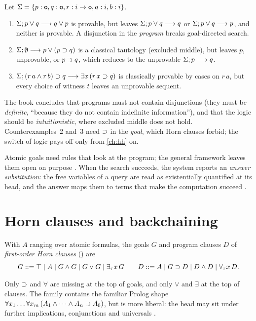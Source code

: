\begin{example}\label{ex:horn-counter}
Let $\Sigma=\{p:\mathsf{o},q:\mathsf{o},r:i\to\mathsf{o},a:i,b:i\}$.
\begin{enumerate}
  \item $\Sigma;p\vee q\longrightarrow q\vee p$ is provable, but  leaves $\Sigma;p\vee q\longrightarrow q$ or
    $\Sigma;p\vee q\longrightarrow p$, and neither is provable. A disjunction in the \emph{program} breaks
    goal-directed search.
  \item $\Sigma;\emptyset\longrightarrow p\vee(p\supset q)$ is a classical tautology (excluded middle), but 
    leaves $p$, unprovable, or $p\supset q$, which  reduces to the unprovable $\Sigma;p\longrightarrow q$.
  \item $\Sigma;(r\,a\wedge r\,b)\supset q\longrightarrow\exists x\,(r\,x\supset q)$ is classically provable by cases on
    $r\,a$, but every choice of witness $t$ leaves an unprovable sequent.
\end{enumerate}
\end{example}
The book concludes  that programs must not contain disjunctions (they must be \emph{definite},
``because they do not contain indefinite information''), and that the logic should be
\emph{intuitionistic}, where excluded middle does not hold. Counterexamples~2 and~3 need $\supset$ in the
\emph{goal}, which Horn clauses forbid; the switch of logic pays off only from \cref{ch:hh} on.

Atomic goals need rules that look at the program; the general framework leaves them open on purpose
. When the search succeeds, the system reports an \emph{answer substitution}: the free variables
of a query are read as existentially quantified at its head, and the answer maps them to terms that make
the computation succeed .

\section{Horn clauses and backchaining}\label{sec:horn-fohc}

\begin{definition}\label{def:horn-fohc}
With $A$ ranging over atomic formulas, the goals $G$ and program clauses $D$ of \emph{first-order Horn
clauses} (\fohc) are
\[
  G ::= \top \mid A \mid G\wedge G \mid G\vee G \mid \exists_\tau x\,G
  \qquad
  D ::= A \mid G\supset D \mid D\wedge D \mid \forall_\tau x\,D .
\]
\end{definition}
Only $\supset$ and $\forall$ are missing at the top of goals, and only $\vee$ and $\exists$ at the top of
clauses. The family contains the familiar Prolog shape $\forall x_1\ldots\forall x_m\,(A_1\wedge\cdots\wedge
A_n\supset A_0)$, but is more liberal: the head may sit under further implications, conjunctions and
universals .

